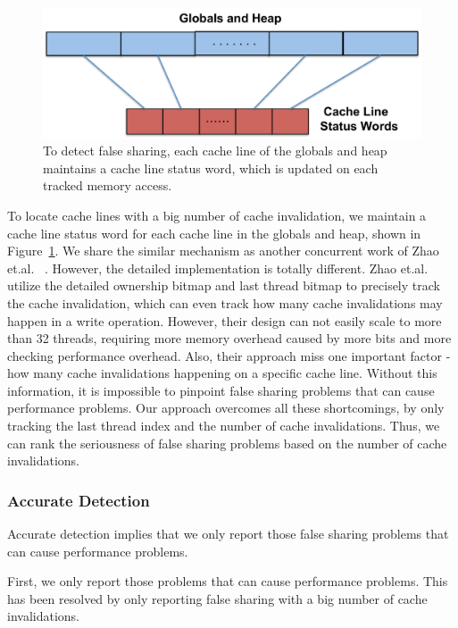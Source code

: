 \begin{figure}[!t]
\centering
\includegraphics[width=5in]{fig/cachelinestatuswords}
\caption{
To detect false sharing, each cache line of the globals and heap maintains a cache line status word, which is updated on each tracked memory access. \label{fig:cachelinestatusword}}
\end{figure}


To locate cache lines with a big number of cache invalidation, we maintain a cache line status word for each cache line in the globals and heap, shown in Figure~\ref{fig:cachelinestatusword}. We share the similar mechanism as another concurrent work of Zhao et.al. ~\cite{qinzhao}. However, the detailed implementation is totally different. Zhao et.al. utilize the detailed ownership bitmap and last thread bitmap to precisely track the cache invalidation, which can even track how many cache invalidations may happen in a write operation. However, their design can not easily scale to more than 32 threads, requiring more memory overhead caused by more bits and more checking performance overhead. Also, their approach miss one important factor - how many cache invalidations happening on a specific cache line. Without this information, it is impossible to pinpoint false sharing problems that can cause performance problems.   
Our approach overcomes all these shortcomings, by only tracking the last thread index and the number of cache invalidations. Thus, we can rank the seriousness of false sharing problems based on the number of cache invalidations. 

\subsubsection{Accurate Detection}
\label{sec:accuratedetect}

Accurate detection implies that we only report those false sharing problems that can cause performance problems. 

First, we only report those problems that can cause performance problems. This has been resolved by only reporting false sharing with a big number of cache invalidations. 

